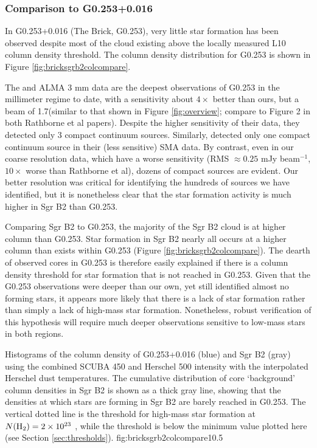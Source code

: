 \documentclass[twocolumn]{aastex61}
\begin{document}
\subsubsection{Comparison to G0.253+0.016}
In G0.253+0.016 (The Brick, G0.253), very little star formation
has been observed
\citep{Longmore2013a,Johnston2014a,Rathborne2014a,Rathborne2015a} despite most
of the cloud existing above the locally measured L10 column
density threshold.  The column density distribution for G0.253
is shown in Figure \ref{fig:bricksgrb2colcompare}.

The \citet{Rathborne2014a} and \citet{Rathborne2015a} ALMA 3 mm data are the
deepest observations of G0.253 in the millimeter regime to date, with a
sensitivity about $4\times$ better than ours, but a beam of 1.7\arcsec (similar
to that shown in Figure \ref{fig:overview}; compare to Figure 2 in both
Rathborne et al papers).  Despite the higher sensitivity of their data,
they detected only 3 compact continuum sources.  Similarly,
\citet{Kauffmann2013a} detected only one compact continuum source in their
(less sensitive) SMA data.  By contrast, even in our coarse resolution data, which
have a worse sensitivity (RMS $\approx 0.25$ mJy beam$^{-1}$, $10\times$ worse
than Rathborne et al), dozens of compact sources are evident.  Our better
resolution was critical for identifying the hundreds of sources we have
identified, but it is nonetheless clear that the star formation activity is
much higher in Sgr B2 than G0.253.


Comparing Sgr B2 to G0.253, the majority of the Sgr B2 cloud is at higher
column than G0.253.  Star formation in Sgr B2 nearly all occurs
at a higher column than exists within G0.253 (Figure
\ref{fig:bricksgrb2colcompare}).  The dearth of observed cores in G0.253 is
therefore easily explained if there is a column density threshold for star
formation that is not reached in G0.253.  Given that the G0.253 observations
were deeper than our own, yet still identified almost no forming stars, it
appears more likely that there is a lack of star formation rather than simply a
lack of high-mass star formation.  Nonetheless, robust verification of this
hypothesis will require much deeper observations sensitive to low-mass stars
in both regions.

{Histograms of the column density of G0.253+0.016 (blue) and Sgr B2 (gray)
using the combined SCUBA 450 \um and Herschel 500 \um intensity with the
interpolated Herschel dust temperatures.  The cumulative distribution of core
`background' column densities in Sgr B2 is shown as a thick gray line, showing
that the densities at which stars are forming in Sgr B2 are barely
reached in G0.253.  The vertical dotted line is the \citet{Krumholz2008a}
threshold for high-mass star formation at $N(\textrm{H}_{2})=2\times10^{23}$ \persc, while
the \citet{Lada2010a} threshold is below the minimum value plotted here (see
Section \ref{sec:thresholds}).}
{fig:bricksgrb2colcompare}{1}{0.5\textwidth}
\end{document}
